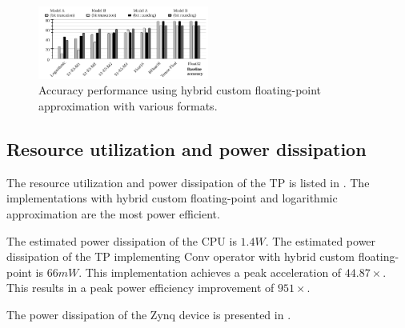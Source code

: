 \begin{figure}[t!]
	\centering
	\includegraphics[width=0.5\textwidth]{../figures/all_models_accuracy.pdf}
	\caption{Accuracy performance using hybrid custom floating-point approximation with various formats.}
	\label{fig:accuracy}
\end{figure}

\subsection{Resource utilization and power dissipation}
The resource utilization and power dissipation of the TP is listed in . The implementations with hybrid custom floating-point and logarithmic approximation are the most power efficient.

The estimated power dissipation of the CPU is $1.4W$. The estimated power dissipation of the TP implementing Conv operator with hybrid custom floating-point is $66mW$. This implementation achieves a peak acceleration of $44.87\times$. This results in a peak power efficiency improvement of $951\times$.

The power dissipation of the Zynq device is presented in .

